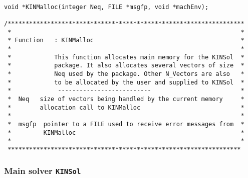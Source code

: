 \documentclass[11pt]{article}
\begin{document}
\small
\begin{verbatim}

void *KINMalloc(integer Neq, FILE *msgfp, void *machEnv);

/******************************************************************
 *                                                                *
 * Function   : KINMalloc                                         *
 *                                                                *
 *            This function allocates main memory for the KINSol  *
 *            package. It also allocates several vectors of size  *
 *            Neq used by the package. Other N_Vectors are also   *
 *            to be allocated by the user and supplied to KINSol  *
 *             --------------------------                         *
 *  Neq   size of vectors being handled by the current memory     *
 *        allocation call to KINMalloc                            *
 *                                                                *
 *  msgfp  pointer to a FILE used to receive error messages from  *
 *         KINMalloc                                              *
 *                                                                *
 *****************************************************************
\end{verbatim}
\normalsize

\subsubsection{Main solver  {\tt KINSol}}
\end{document}
